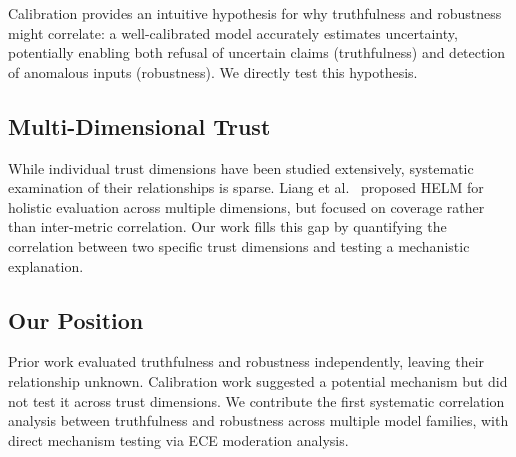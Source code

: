 Calibration provides an intuitive hypothesis for why truthfulness and robustness might correlate: a well-calibrated model accurately estimates uncertainty, potentially enabling both refusal of uncertain claims (truthfulness) and detection of anomalous inputs (robustness). We directly test this hypothesis.

\subsection{Multi-Dimensional Trust}

While individual trust dimensions have been studied extensively, systematic examination of their relationships is sparse. Liang et al.~\cite{liang2023helm} proposed HELM for holistic evaluation across multiple dimensions, but focused on coverage rather than inter-metric correlation. Our work fills this gap by quantifying the correlation between two specific trust dimensions and testing a mechanistic explanation.

\subsection{Our Position}

Prior work evaluated truthfulness and robustness independently, leaving their relationship unknown. Calibration work suggested a potential mechanism but did not test it across trust dimensions. We contribute the first systematic correlation analysis between truthfulness and robustness across multiple model families, with direct mechanism testing via ECE moderation analysis.
